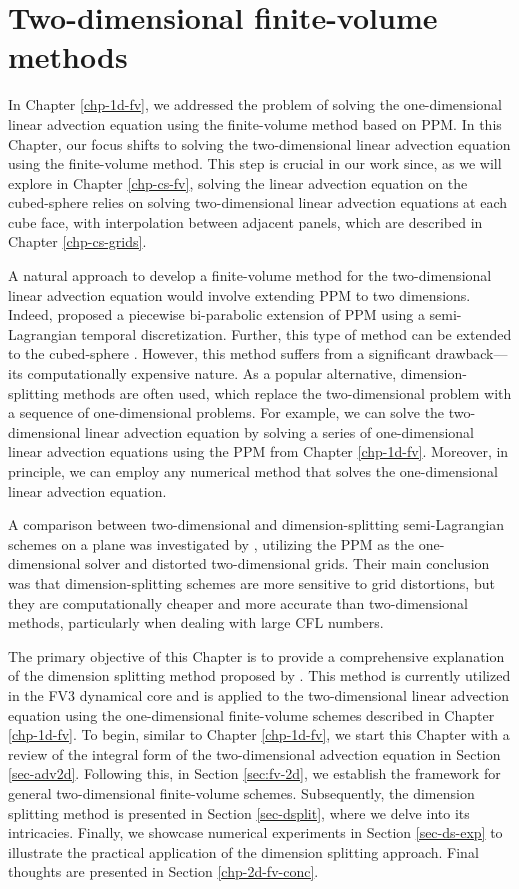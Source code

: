 \chapter{Two-dimensional finite-volume methods}
\label{chp-2d-fv}
In Chapter \ref{chp-1d-fv}, we addressed the problem of solving the one-dimensional linear advection 
equation using the finite-volume method based on PPM.
In this Chapter, our focus shifts to solving the two-dimensional linear advection equation using the finite-volume method.
This step is crucial in our work since, as we will explore in Chapter \ref{chp-cs-fv},
solving the linear advection equation on the cubed-sphere relies on solving two-dimensional linear advection equations at each cube face,
with interpolation between adjacent panels, which are described in Chapter \ref{chp-cs-grids}.

A natural approach to develop a finite-volume method for the two-dimensional linear advection equation would involve extending PPM to two dimensions.
Indeed, \citet{rancic:1992} proposed a piecewise bi-parabolic extension of PPM using a semi-Lagrangian temporal discretization.
Further, this type of method can be extended to the cubed-sphere \citep{lauritzen:2010}.
However, this method suffers from a significant drawback—its computationally expensive nature.
As a popular alternative, dimension-splitting methods are often used, which replace the two-dimensional problem with a sequence of one-dimensional problems.
For example, we can solve the two-dimensional linear advection equation by solving a series of one-dimensional linear advection equations
using the PPM from Chapter \ref{chp-1d-fv}. Moreover, in principle, we can employ any numerical method that solves the one-dimensional linear advection equation.

A comparison between two-dimensional and dimension-splitting semi-Lagrangian schemes on a plane was investigated by \citet{chen:2017},
utilizing the PPM as the one-dimensional solver and distorted two-dimensional grids.
Their main conclusion was that dimension-splitting schemes are more sensitive to grid distortions, but they are computationally
cheaper and more accurate than two-dimensional methods, particularly when dealing with large CFL numbers.

The primary objective of this Chapter is to provide a comprehensive explanation of the dimension splitting method proposed by \citet{lin:1996}.
This method is currently utilized in the FV3 dynamical core and is applied to the two-dimensional linear advection equation using the one-dimensional
finite-volume schemes described in Chapter \ref{chp-1d-fv}.
To begin, similar to Chapter \ref{chp-1d-fv}, we start this Chapter with a review of the integral form of the two-dimensional
advection equation in Section \ref{sec-adv2d}. Following this, in Section \ref{sec:fv-2d}, we establish the framework for general two-dimensional finite-volume schemes.
Subsequently, the dimension splitting method is presented in Section \ref{sec-dsplit}, where we delve into its intricacies.
Finally, we showcase numerical experiments in Section \ref{sec-ds-exp} to illustrate the practical application of the dimension splitting approach.
Final thoughts are presented in Section \ref{chp-2d-fv-conc}.

